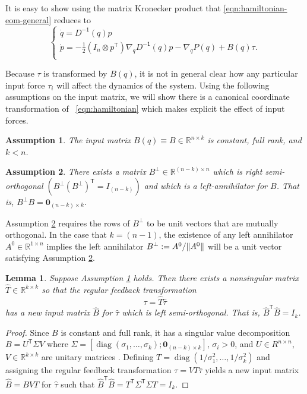 \documentclass[journal,twoside,web]{ieeecolor}
\newtheorem{lemma}[thm]{Lemma} %
\newtheorem{assm}{Assumption} %
\DeclarePairedDelimiter{\norm}{\lVert}{\rVert}
\DeclareMathOperator{\Diag}{diag}
\newcommand*{\diag}[1]{\Diag\left(#1\right)}
\newcommand*{\tpose}{^\mathsf{T}}
\newcommand*{\inv}{^\mathsf{-1}}
\newcommand*{\R}{\mathbb{R}}
\newcommand*{\Id}[1]{I_{#1}}
\newcommand*{\Zmat}[1]{\bm{0}_{#1}}
\begin{document}
It is easy to show using the matrix Kronecker product that
\eqref{eqn:hamiltonian-eom-general} reduces to
\begin{equation}\label{eqn:hamiltonian-full-dynamics}
     \begin{cases}
        \dot{q} = D\inv(q)p \\
        \dot{p} = -\frac{1}{2} (\Id{n} \otimes p\tpose) \nabla_q D\inv(q) p
        - \nabla_q P(q) + B(q) \tau
        . \\
    \end{cases}
\end{equation}

Because \(\tau\) is transformed by \(B(q)\), it is not in general clear how any
particular input force \(\tau_i\) will affect the dynamics of the system. 
Using the following assumptions on the input matrix, we will show there is
a canonical coordinate transformation of ~\eqref{eqn:hamiltonian} 
which makes explicit the effect of input forces.

\begin{assm}\label{assm:B-const}
    The input matrix \(B(q) \equiv B \in \R^{n\times k}\) is constant,
    full rank, and \(k < n\).
\end{assm}

\begin{assm}\label{assm:B-perp}
    There exists a matrix 
    \(B^\perp \in \R^{(n-k)\times n}\)
    which is right semi-orthogonal 
    \(\left(B^\perp(B^\perp)\tpose = \Id{(n-k)}\right)\)
    and which is a left-annihilator for \(B\). 
    That is, \(B^\perp B = \Zmat{(n-k) \times k}\).
\end{assm}

Assumption \ref{assm:B-perp} requires the rows of \(B^\perp\) to be unit vectors
that are mutually orthogonal. 
In the case that \(k = (n-1)\), the existence of any left annihilator 
\(A^0 \in \R^{1\times n}\) implies the left annihilator 
\(B^\perp := A^0/\norm{A^0}\) will be a unit vector satisfying Assumption \ref{assm:B-perp}.

\begin{lemma}\label{lemma:B-orthogonal}
    Suppose Assumption \ref{assm:B-const} holds. Then
    there exists a nonsingular matrix \(\hat{T} \in \R^{k \times k}\) 
    so that the regular feedback transformation 
    \[
        \tau = \hat{T} \hat{\tau}
    \] 
    has a new input matrix \(\hat{B}\) for \(\hat{\tau}\) which is left
    semi-orthogonal.  
    That is, \(\hat{B}\tpose \hat{B} = \Id{k}\).
\end{lemma}
\begin{proof}
    Since \(B\) is constant and full rank, it has a singular value decomposition 
    \(B = U\tpose \Sigma V\) where 
    \(\Sigma = [\diag{\sigma_1,\ldots,\sigma_k}; \Zmat{(n-k)\times k}]\),
    \(\sigma_i > 0\), and \(U \in R^{n \times n}\),
    \(V \in \R^{k \times k}\) are unitary matrices \cite{calculating_svd}.
    Defining \(T = \diag{1/\sigma_1^2,\ldots,1/\sigma_k^2}\) and assigning the
    regular feedback transformation \(\tau = V T \hat{\tau}\) yields a new input
    matrix \(\hat{B} = B V T\) for \(\hat{\tau}\) such that
    \(\hat{B}\tpose \hat{B} = T\tpose \Sigma\tpose \Sigma T = \Id{k}\).
\end{proof}
\end{document}
